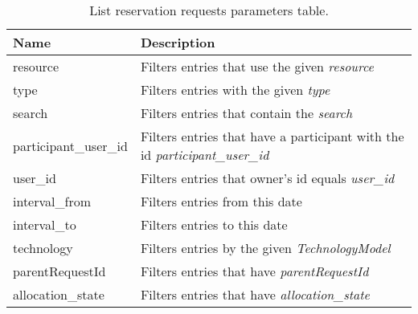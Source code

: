 \begin{table}[!ht]
    \begin{tabularx}{\textwidth}{lX}
        \toprule
        Name & Description \\
        \midrule
        resource & Filters entries that use the given \emph{resource} \\
        type & Filters entries with the given \emph{type} \\
        search & Filters entries that contain the \emph{search} \\
        participant\_user\_id &  Filters entries that have a participant with the id \emph{participant\_user\_id} \\
        user\_id & Filters entries that owner's id equals \emph{user\_id} \\
        interval\_from & Filters entries from this date \\  
        interval\_to & Filters entries to this date \\
        technology & Filters entries by the given \emph{TechnologyModel} \\
        parentRequestId & Filters entries that have \emph{parentRequestId} \\
        allocation\_state & Filters entries that have \emph{allocation\_state} \\
        \bottomrule
    \end{tabularx}
    \caption{List reservation requests parameters table.}
    \label{tab:res}
\end{table}

